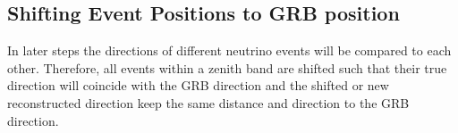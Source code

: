\subsection{Shifting Event Positions to GRB position}
\label{sec:shift2source}
In later steps the directions of different neutrino events will be compared to
each other. Therefore, all events within a zenith band are shifted such
that their true
direction  will coincide with the GRB direction and the
shifted or new reconstructed direction keep the same distance
and direction to the GRB direction.



% 
